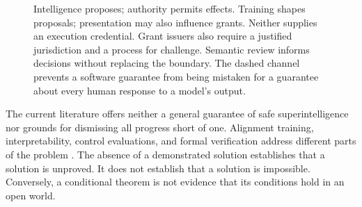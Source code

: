 \documentclass[10pt,twocolumn,letterpaper]{article}
\begin{document}
\begin{figure}[t]
\centering
{}
\caption{Intelligence proposes; authority permits effects. Training shapes proposals; presentation may also influence grants. Neither supplies an execution credential. Grant issuers also require a justified jurisdiction and a process for challenge. Semantic review informs decisions without replacing the boundary. The dashed channel prevents a software guarantee from being mistaken for a guarantee about every human response to a model's output.}
\label{fig:architecture}
\end{figure}

The current literature offers neither a general guarantee of safe superintelligence nor grounds for dismissing all progress short of one. Alignment training, interpretability, control evaluations, and formal verification address different parts of the problem \cite{iasr,control,gsai}. The absence of a demonstrated solution establishes that a solution is unproved. It does not establish that a solution is impossible. Conversely, a conditional theorem is not evidence that its conditions hold in an open world.
\end{document}
